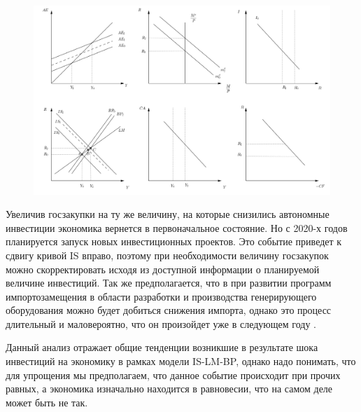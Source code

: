 \documentclass[12pt,a4paper, oneside]{extreport}
\begin{document}
\begin{figure}
	\centering
	\includegraphics[width=1\linewidth]{screenshot003}
	\caption{}
	\label{fig:screenshot003}
\end{figure}



Увеличив госзакупки на ту же величину, на которые снизились автономные инвестиции экономика вернется в первоначальное состояние.  Но   с 2020-х годов планируется запуск новых инвестиционных проектов. Это событие приведет к сдвигу кривой IS вправо, поэтому при необходимости  величину госзакупок можно скорректировать исходя из доступной информации о планируемой величине инвестиций.  
Так же предполагается, что в при  развитии программ импортозамещения в области разработки и производства генерирующего оборудования можно будет добиться снижения импорта, однако это процесс длительный и маловероятно, что он  произойдет уже в следующем году \cite{ID5}. 


Данный анализ отражает общие тенденции возникшие в результате  шока инвестиций на экономику в рамках модели IS-LM-BP, однако надо понимать, что для упрощения мы предполагаем, что данное событие происходит при прочих равных, а экономика изначально находится в равновесии, что на самом деле может быть не так. 








\nocite{*}  %
\end{document}
